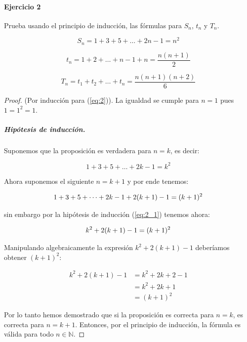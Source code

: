 \documentclass{article}
\begin{document}
\paragraph{Ejercicio 2} Prueba usando el principio de inducción, las fórmulas para $S_n$, $t_n$ y $T_n$.

\begin{equation} \label{eq:2}
	S_n = 1 + 3 +5 + \dots + 2n - 1 = n^2 
\end{equation}

\begin{equation}\label{eq:3}
	t_n = 1 + 2 + \dots + n - 1  + n = \frac{n(n+1)}{2}
\end{equation}

\begin{equation}\label{eq:4}
	T_n = t_1 + t_2 + \dots + t_n = \frac{n(n+1)(n+2)}{6}
\end{equation}

\begin{proof}(Por inducción para (\ref{eq:2})). La igualdad se cumple para $n=1$ pues $1 = 1^2 = 1$.
	
\subparagraph{Hipótesis de inducción.} Suponemos que la proposición es verdadera para $n=k$, es decir:

	\begin{equation}\label{eq:2_1}
		1 + 3 + 5 + \dots + 2k-1 = k^2
	\end{equation}

Ahora suponemos el siguiente $n = k + 1$ y por ende tenemos:

\[
	1 + 3 + 5 + \dots + 2k - 1 + 2(k+1) - 1 = (k + 1)^2\\
\]	

sin embargo por la hipótesis de inducción (\ref{eq:2_1}) tenemos ahora:

\[
	k^2 + 2(k+1) - 1 = (k + 1)^2\\
\]

Manipulando algebraicamente la expresión $k^2 + 2(k+1) - 1$ deberíamos obtener $(k + 1)^2$:

\begin{align*}
	k^2 + 2(k+1) - 1 &= k^2 + 2k + 2 - 1 \\
	&= k^2 + 2k + 1\\
	&= (k + 1)^2
\end{align*}

Por lo tanto hemos demostrado que si la proposición es correcta para $n = k$, es correcta para $n=k+1$. Entonces, por el principio de inducción, la fórmula es válida para todo $n \in \mathbb{N}$.

\end{proof}
\end{document}
